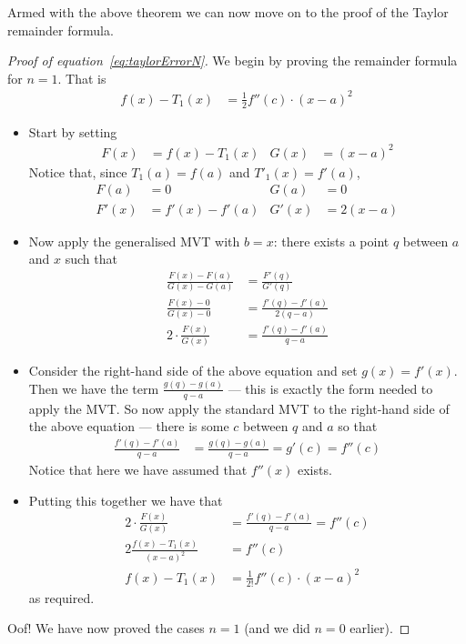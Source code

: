 Armed with the above theorem we can now move on to the proof of the Taylor remainder
formula.

\begin{proof}[Proof of equation~\eqref{eq:taylorErrorN}]
We begin by proving the remainder formula for $n=1$. That is
\begin{align*}
  f(x) - T_1(x) &= \frac{1}{2}f''(c) \cdot(x-a)^2
\end{align*}
\begin{itemize}
 \item Start by setting
\begin{align*}
  F(x) &= f(x)-T_1(x) &
  G(x) &= (x-a)^2
\end{align*}
Notice that, since $T_1(a)=f(a)$ and $T'_1(x) = f'(a)$,
\begin{align*}
  F(a) &= 0 & G(a)&=0 \\
  F'(x) &= f'(x)-f'(a) & G'(x) &= 2(x-a)
\end{align*}
\item Now apply the generalised MVT with $b=x$: there exists a point $q$ between $a$ and
$x$ such that
\begin{align*}
  \frac{F(x)-F(a)}{G(x)-G(a)} &= \frac{F'(q)}{G'(q)} \\
  \frac{F(x)-0}{G(x) - 0} &= \frac{f'(q)-f'(a)}{2(q-a)} \\
  2 \cdot \frac{F(x)}{G(x)} &= \frac{f'(q)-f'(a)}{q-a}
\end{align*}
\item Consider the right-hand side of the above equation and set $g(x) = f'(x)$. Then we
have the term $\frac{g(q)-g(a)}{q-a}$  --- this is exactly the form needed to apply the
MVT. So now apply the standard MVT to the right-hand side of the above equation
--- there is some $c$ between $q$ and $a$ so that
\begin{align*}
  \frac{f'(q)-f'(a)}{q-a} &= \frac{g(q)-g(a)}{q-a} = g'(c) = f''(c)
\end{align*}
Notice that here we have assumed that $f''(x)$ exists.

\item Putting this together we have that
\begin{align*}
  2 \cdot \frac{F(x)}{G(x)} &= \frac{f'(q)-f'(a)}{q-a} = f''(c) \\
  2 \frac{f(x)-T_1(x)}{(x-a)^2} &= f''(c) \\
  f(x) - T_1(x) &= \frac{1}{2!} f''(c) \cdot (x-a)^2
\end{align*}
as required.
\end{itemize}
Oof! We have now proved the cases $n=1$ (and we did $n=0$ earlier).



\end{proof}
